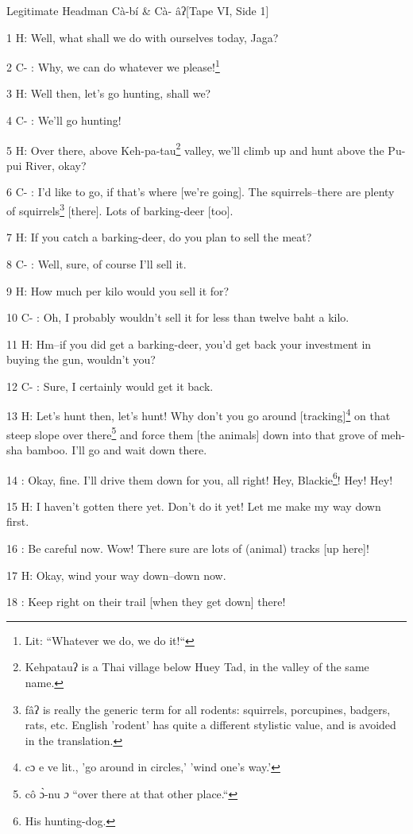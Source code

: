 
Legitimate Headman Cà-bí \& Cà- âʔ[Tape VI, Side 1]

1 H: Well, what shall we do with ourselves today, Jaga?

2 C- : Why, we can do whatever we please!\footnote{Lit: ``Whatever we do, we do it!``}

3 H: Well then, let's go hunting, shall we?

4 C- : We'll go hunting!

5 H: Over there, above Keh-pa-tau\footnote{Kehpatauʔ is a Thai village below Huey Tad, in the valley of the same name.} valley, we'll climb up and hunt above the
Pu-pui River, okay?

6 C- : I'd like to go, if that's where [we're going]. The squirrels--there are
plenty of squirrels\footnote{fâʔ is really the generic term for all rodents: squirrels, porcupines, badgers, rats, etc. English 'rodent' has quite a different stylistic value, and is avoided in the translation.} [there]. Lots of barking-deer [too].

7 H: If you catch a barking-deer, do you plan to sell the meat?

8 C- : Well, sure, of course I'll sell it.

9 H: How much per kilo would you sell it for?

10 C- : Oh, I probably wouldn't sell it for less than twelve baht a kilo.

11 H: Hm--if you did get a barking-deer, you'd get back your investment in buying
the gun, wouldn't you?

12 C- : Sure, I certainly would get it back.

13 H: Let's hunt then, let's hunt! Why don't you go around [tracking]\footnote{cɔ e ve lit., 'go around in circles,' 'wind one's way.'} on that
steep slope over there\footnote{cô ɔ̀-nu \emph{ɔ} ``over there at that other place.``} and force them [the animals] down into that grove of
meh-sha bamboo. I'll go and wait down there.

14  : Okay, fine. I'll drive them down for you, all right! Hey, Blackie\footnote{His hunting-dog.}! Hey!
Hey!

15 H: I haven't gotten there yet. Don't do it yet! Let me make my way down first.

16  : Be careful now. Wow! There sure are lots of (animal) tracks [up here]!

17 H: Okay, wind your way down--down now.

18  : Keep right on their trail [when they get down] there!

